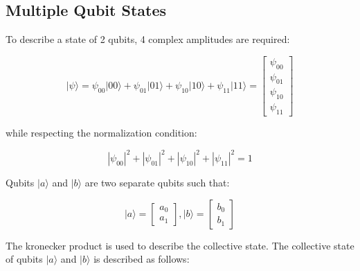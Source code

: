 \subsection{Multiple Qubit States}
\label{sec:multq}

To describe a state of 2 qubits, 4 complex amplitudes are required:

\begin{linenomath}
\begin{equation}
\vert \psi \rangle = \psi_{00}\vert 00 \rangle + \psi_{01}\vert 01 \rangle + \psi_{10}\vert 10 \rangle + \psi_{11}\vert 11 \rangle = \begin{bmatrix} \psi_{00} \\ \psi_{01} \\ \psi_{10} \\ \psi_{11} \end{bmatrix}
\label{eq:multiq}
\end{equation}
\end{linenomath}
while respecting the normalization condition:

\begin{linenomath}
\begin{equation}
	|\psi_{00}|^2 + |\psi_{01}|^2 + |\psi_{10}|^2 + |\psi_{11}|^2 = 1
\label{eq:multinorm}
\end{equation}
\end{linenomath}

Qubits $\vert a \rangle$ and $\vert b \rangle$ are two separate qubits such that:

\begin{linenomath}
\begin{equation}
	\vert a \rangle = \begin{bmatrix} a_0 \\ a_1 \end{bmatrix}, \vert b \rangle = \begin{bmatrix} b_0 \\ b_1 \end{bmatrix}
\label{eq:ab}
\end{equation}
\end{linenomath}

The kronecker product is used to describe the collective state. The collective 
state of qubits $\vert a \rangle$ and $\vert b \rangle$ is described as follows:

